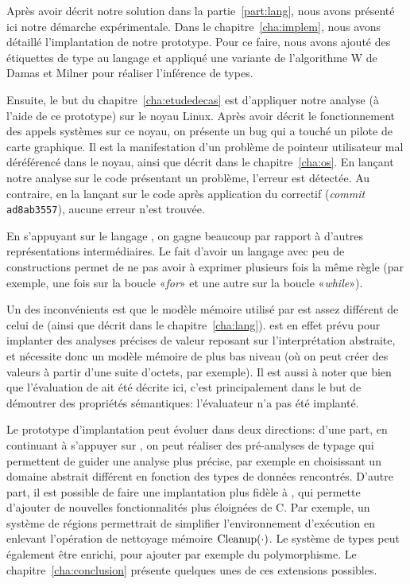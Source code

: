 Après avoir décrit notre solution dans la partie~\ref{part:lang}, nous avons
présenté ici notre démarche expérimentale. Dans le chapitre~\ref{cha:implem},
nous avons détaillé l'implantation de notre prototype. Pour ce faire, nous avons
ajouté des étiquettes de type au langage \newspeak et appliqué une variante de
l'algorithme W de Damas et Milner pour réaliser l'inférence de types.

Ensuite, le but du chapitre~\ref{cha:etudedecas} est d'appliquer notre analyse
(à l'aide de ce prototype) sur le noyau Linux. Après avoir décrit le
fonctionnement des appels systèmes sur ce noyau, on présente un bug qui a touché
un pilote de carte graphique. Il est la manifestation d'un problème de pointeur
utilisateur mal déréférencé dans le noyau, ainsi que décrit dans le
chapitre~\ref{cha:os}. En lançant notre analyse sur le code présentant un
problème, l'erreur est détectée. Au contraire, en la lançant sur le code après
application du correctif (\emph{commit} \texttt{ad8ab3557}), aucune erreur n'est
trouvée.

En s'appuyant sur le langage \newspeak, on gagne beaucoup par rapport à d'autres
représentations intermédiaires. Le fait d'avoir un langage avec peu de
constructions permet de ne pas avoir à exprimer plusieurs fois la même règle
(par exemple, une fois sur la boucle «\emph{for}» et une autre sur la boucle
«\emph{while}»).

Un des inconvénients est que le modèle mémoire utilisé par \newspeak est assez
différent de celui de \langname (ainsi que décrit dans le
chapitre~\ref{cha:lang}). \newspeak est en effet prévu pour implanter des
analyses précises de valeur reposant sur l'interprétation abstraite, et
nécessite donc un modèle mémoire de plus bas niveau (où on peut créer des
valeurs à partir d'une suite d'octets, par exemple). Il est aussi à noter que
bien que l'évaluation de \langname ait été décrite ici, c'est principalement
dans le but de démontrer des propriétés sémantiques: l'évaluateur n'a pas été
implanté.

Le prototype d'implantation peut évoluer dans deux directions: d'une part, en
continuant à s'appuyer sur \newspeak, on peut réaliser des pré-analyses de
typage qui permettent de guider une analyse plus précise, par exemple en
choisissant un domaine abstrait différent en fonction des types de données
rencontrés. D'autre part, il est possible de faire une implantation plus fidèle
à \langname, qui permette d'ajouter de nouvelles fonctionnalités plus éloignées
de C. Par exemple, un système de régions permettrait de simplifier
l'environnement d'exécution en enlevant l'opération de nettoyage mémoire
$\mathrm{Cleanup}(\cdot)$. Le système de types peut également être enrichi, pour ajouter
par exemple du polymorphisme. Le chapitre~\ref{cha:conclusion} présente quelques
unes de ces extensions possibles.

